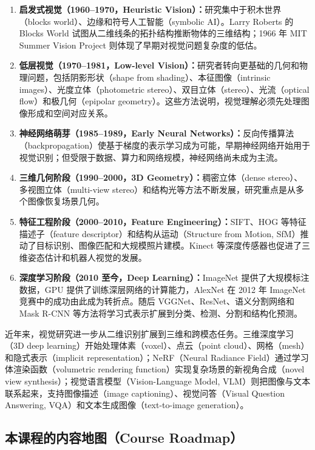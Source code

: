 \documentclass{ctexart}
\begin{document}
\begin{enumerate}[label=\arabic*.]
    \item \textbf{启发式视觉（1960--1970，Heuristic Vision）：}研究集中于积木世界（blocks world）、边缘和符号人工智能（symbolic AI）。Larry Roberts 的 Blocks World 试图从二维线条的拓扑结构推断物体的三维结构；1966 年 MIT Summer Vision Project 则体现了早期对视觉问题复杂度的低估。
    \item \textbf{低层视觉（1970--1981，Low-level Vision）：}研究者转向更基础的几何和物理问题，包括阴影形状（shape from shading）、本征图像（intrinsic images）、光度立体（photometric stereo）、双目立体（stereo）、光流（optical flow）和极几何（epipolar geometry）。这些方法说明，视觉理解必须先处理图像形成和空间对应关系。
    \item \textbf{神经网络萌芽（1985--1989，Early Neural Networks）：}反向传播算法（backpropagation）使基于梯度的表示学习成为可能，早期神经网络开始用于视觉识别；但受限于数据、算力和网络规模，神经网络尚未成为主流。
    \item \textbf{三维几何阶段（1990--2000，3D Geometry）：}稠密立体（dense stereo）、多视图立体（multi-view stereo）和结构光等方法不断发展，研究重点是从多个图像恢复场景几何。
    \item \textbf{特征工程阶段（2000--2010，Feature Engineering）：}SIFT、HOG 等特征描述子（feature descriptor）和结构从运动（Structure from Motion, SfM）推动了目标识别、图像匹配和大规模照片建模。Kinect 等深度传感器也促进了三维姿态估计和机器人视觉的发展。
    \item \textbf{深度学习阶段（2010 至今，Deep Learning）：}ImageNet 提供了大规模标注数据，GPU 提供了训练深层网络的计算能力，AlexNet 在 2012 年 ImageNet 竞赛中的成功由此成为转折点。随后 VGGNet、ResNet、语义分割网络和 Mask R-CNN 等方法将学习式表示扩展到分类、检测、分割和结构化预测。
\end{enumerate}

近年来，视觉研究进一步从二维识别扩展到三维和跨模态任务。三维深度学习（3D deep learning）开始处理体素（voxel）、点云（point cloud）、网格（mesh）和隐式表示（implicit representation）；NeRF（Neural Radiance Field）通过学习体渲染函数（volumetric rendering function）实现复杂场景的新视角合成（novel view synthesis）；视觉语言模型（Vision-Language Model, VLM）则把图像与文本联系起来，支持图像描述（image captioning）、视觉问答（Visual Question Answering, VQA）和文本生成图像（text-to-image generation）。

\subsection{本课程的内容地图（Course Roadmap）}
\end{document}
